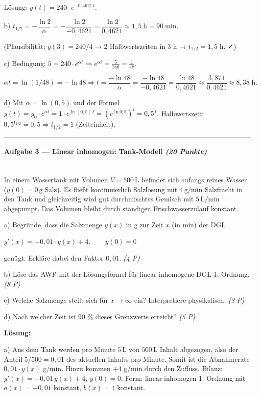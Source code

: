 \documentclass[11pt, a4paper]{article}
\begin{document}
Lösung: $y(t)=240\cdot e^{-0{,}4621\,t}.$


b) $t_{1/2}=-\dfrac{\ln 2}{\alpha}= -\dfrac{\ln 2}{-0{,}4621}=\dfrac{\ln 2}{0{,}4621}\approx 1{,}5\;\text{h} = 90\;\text{min}.$

(Plausibilität: $y(3)=240/4$ → 2 Halbwertszeiten in 3 h → $t_{1/2}=1{,}5$ h. ✓)


c) Bedingung: $5=240\cdot e^{\alpha t} \Rightarrow e^{\alpha t}=\tfrac{5}{240}=\tfrac{1}{48}.$

$\alpha t = \ln(1/48) = -\ln 48 \Rightarrow t = \dfrac{-\ln 48}{\alpha} = \dfrac{-\ln 48}{-0{,}4621} = \dfrac{\ln 48}{0{,}4621}\approx \dfrac{3{,}871}{0{,}4621}\approx 8{,}38\;\text{h}.$


d) Mit $\alpha=\ln(0{,}5)$ und der Formel $y(t)=y_0\cdot e^{\alpha t}=1\cdot e^{\ln(0{,}5)\,t}=(e^{\ln 0{,}5})^t=0{,}5^{\,t}.$ Halbwertszeit: $0{,}5^{t_{1/2}}=0{,}5 \Rightarrow t_{1/2}=1$ (Zeiteinheit).



\noindent\textcolor{rulegray}{\rule{\linewidth}{0.4pt}}


\paragraph{Aufgabe 3 — Linear inhomogen: Tank-Modell \textit{(20 Punkte)}}\mbox{}\\[2pt]

In einem Wassertank mit Volumen $V=500\,\text{L}$ befindet sich anfangs reines Wasser ($y(0)=0\,\text{g}$ Salz). Es fließt kontinuierlich Salzlösung mit $4\,\text{g/min}$ Salzfracht in den Tank und gleichzeitig wird gut durchmischtes Gemisch mit $5\,\text{L/min}$ abgepumpt. Das Volumen bleibt durch ständigen Frischwasserzulauf konstant.


a) Begründe, dass die Salzmenge $y(x)$ in g zur Zeit $x$ (in min) der DGL

$y'(x) = -0{,}01\cdot y(x) + 4, \qquad y(0)=0$

genügt. Erkläre dabei den Faktor $0{,}01$. \textit{(4 P)}

b) Löse das AWP mit der Lösungsformel für linear inhomogene DGL 1. Ordnung. \textit{(8 P)}

c) Welche Salzmenge stellt sich für $x\to\infty$ ein? Interpretiere physikalisch. \textit{(3 P)}

d) Nach welcher Zeit ist 90 \% dieses Grenzwerts erreicht? \textit{(5 P)}


\textbf{Lösung:}


a) Aus dem Tank werden pro Minute $5\,\text{L}$ von $500\,\text{L}$ Inhalt abgezogen, also der Anteil $5/500 = 0{,}01$ des aktuellen Inhalts pro Minute. Somit ist die Abnahmerate $0{,}01\cdot y(x)$ g/min. Hinzu kommen $+4$ g/min durch den Zufluss. Bilanz: $y'(x)=-0{,}01\,y(x)+4$, $y(0)=0$. Form: linear inhomogen 1. Ordnung mit $a(x)=-0{,}01$ konstant, $b(x)=4$ konstant.
\end{document}
